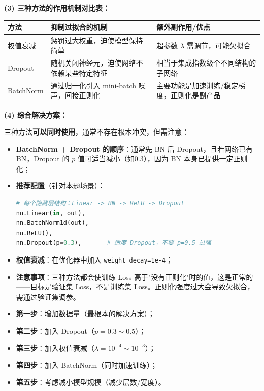 \documentclass[a4paper,11pt]{ctexart}
\begin{document}
\begin{solutionbox}[参考答案与详细解析]
    \textbf{(3) 三种方法的作用机制对比表：}

    \begin{center}
    \begin{tabular}{p{2.5cm} p{4.5cm} p{3.8cm}}
        \toprule
        方法 & 抑制过拟合的机制 & 额外副作用/优点 \\
        \midrule
        权值衰减 & 惩罚过大权重，迫使模型保持简单 & 超参数 $\lambda$ 需调节，可能欠拟合 \\[0.8em]
        Dropout & 随机关闭神经元，迫使网络不依赖某些特定特征 & 相当于集成指数级个不同结构的子网络 \\[0.8em]
        BatchNorm & 通过归一化引入 mini-batch 噪声，间接正则化 & 主要功能是加速训练/稳定梯度，正则化是副产品 \\
        \bottomrule
    \end{tabular}
    \end{center}

    \textbf{(4) 综合解决方案：}

    三种方法\textbf{可以同时使用}，通常不存在根本冲突，但需注意：
    \begin{itemize}
        \item \textbf{BatchNorm + Dropout 的顺序}：通常先 BN 后 Dropout，且若网络已有 BN，Dropout 的 $p$ 值可适当减小（如0.3），因为 BN 本身已提供一定正则化；
        \item \textbf{推荐配置}（针对本题场景）：
        \begin{lstlisting}[language=Python]
# 每个隐藏层结构：Linear -> BN -> ReLU -> Dropout
nn.Linear(in, out),
nn.BatchNorm1d(out),
nn.ReLU(),
nn.Dropout(p=0.3),       # 适度 Dropout，不要 p=0.5 过强
        \end{lstlisting}
        \item \textbf{权值衰减}：在优化器中加入 \texttt{weight\_decay=1e-4}；
        \item \textbf{注意事项}：三种方法都会使训练 Loss 高于"没有正则化"时的值，这是正常的——目标是验证集 Loss，不是训练集 Loss。正则化强度过大会导致欠拟合，需通过验证集调参。
    \end{itemize}

    \begin{keybox}[过拟合处置优先级建议]
        \begin{itemize}
            \item \textbf{第一步}：增加数据量（最根本的解决方案）；
            \item \textbf{第二步}：加入 Dropout（$p=0.3\sim0.5$）；
            \item \textbf{第三步}：加入权值衰减（$\lambda=10^{-4}\sim10^{-3}$）；
            \item \textbf{第四步}：加入 BatchNorm（同时加速训练）；
            \item \textbf{第五步}：考虑减小模型规模（减少层数/宽度）。
        \end{itemize}
    \end{keybox}
\end{solutionbox}
\end{document}
